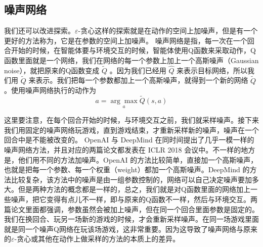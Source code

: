 \subsection{噪声网络} 

我们还可以改进探索。$\varepsilon$-贪心这样的探索就是在动作的空间上加噪声，但是有一个更好的方法称为，它是在参数的空间上加噪声。
噪声网络是指，每一次在一个回合开始的时候，在智能体要与环境交互的时候，智能体使用Q函数来采取动作，Q函数里面就是一个网络，我们在网络的每一个参数上加上一个高斯噪声（Gaussian noise），就把原来的Q函数变成 $\tilde{Q}$ 。因为我们已经用 $\hat{Q}$ 来表示目标网络，所以我们用 $\tilde{Q}$  来表示。我们把每一个参数都加上一个高斯噪声，就得到一个新的网络 $\tilde{Q}$。使用噪声网络执行的动作为
\begin{equation}
    \label{eq:}
    a=\underset{a}{\arg \max} \tilde{Q}(s, a)
\end{equation}

这里要注意，在每个回合开始的时候，与环境交互之前，我们就采样噪声。接下来我们用固定的噪声网络玩游戏，直到游戏结束，才重新采样新的噪声，噪声在一个回合中是不能被改变的。
OpenAI 与 DeepMind 在同时间提出了几乎一模一样的噪声网络方法，并且对应的两篇论文都发表在 ICLR 2018 会议中。不一样的地方是，他们用不同的方法加噪声。OpenAI 的方法比较简单，直接加一个高斯噪声，也就是把每一个参数、每一个权重（weight）都加一个高斯噪声。DeepMind 的方法比较复杂，该方法中的噪声是由一组参数控制的，网络可以自己决定噪声要加多大。但是两种方法的概念都是一样的，总之，我们就是对Q函数里面的网络加上一些噪声，把它变得有点儿不一样，即与原来的Q函数不一样，然后与环境交互。两篇论文里面都强调，参数虽然会被加上噪声，但在同一个回合里面参数是固定的。我们在换回合、玩另一场新的游戏的时候，才会重新采样噪声。在同一场游戏里面就是同一个噪声Q网络在玩该场游戏，这非常重要。因为这导致了噪声网络与原来的$\varepsilon$-贪心或其他在动作上做采样的方法的本质上的差异。


